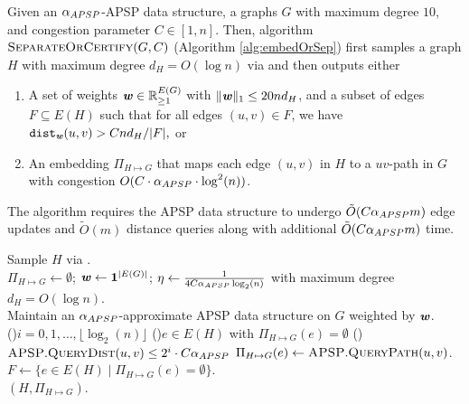 \begin{lemma}
\label{lemma:SeparateOrCertifyBalanced}
Given an $\alpha_{APSP}$-APSP data structure, a graphs $G$ with maximum degree $10$, and congestion parameter $C \in [1, n]$. Then,  algorithm $\textsc{SeparateOrCertify}(G, C)$ (Algorithm \ref{alg:embedOrSep}) first samples a graph $H$ with maximum degree $d_H = O(\log n)$ via  and then outputs either
\begin{enumerate}
    \item A set of weights $\boldsymbol{{\mathit{w}}} \in \mathbb{R}_{\geq 1}^{E(G)}$ with $\|\boldsymbol{{\mathit{w}}}\|_1 \leq 20n d_H$,  and a subset of edges $F \subseteq E(H)$ such that 
    for all edges $(u,v) \in F$, we have $\operatorname{\mathtt{dist}}_{\boldsymbol{{\mathit{w}}}}(u,v) > {C n d_H}/{|F|},$ or
    \item An embedding $\Pi_{H \mapsto G}$ that maps each edge $(u,v)$ in $H$ to a $uv$-path in $G$ with congestion $O(C \cdot \alpha_{APSP} \cdot \log^2(n))$.
\end{enumerate}
The algorithm requires the APSP data structure to undergo $\tilde{O}(C \alpha_{APSP} m)$ edge updates and $\tilde{O}(m)$ distance queries along with additional $\tilde{O}(C \alpha_{APSP} m)$ time.
\end{lemma}

\begin{algorithm}
\DontPrintSemicolon
Sample $H$ via .\\
$\Pi_{H \mapsto G} \gets \emptyset$; $\boldsymbol{\mathit{w}} \gets \mathbf{1}^{|E(G)|}$; $\eta \gets  \frac{1}{ 4 C \alpha_{APSP} \log_2(n)}$ with maximum degree $d_H = O(\log n)$.\label{lne:init}\\
Maintain an $\alpha_{APSP}$-approximate APSP data structure on $G$ weighted by $\boldsymbol{\mathit{w}}$.\\
\For(\label{lne:forLoop}){$i = 0, 1, \ldots, \lfloor \log_2(n) \rfloor$}{
    \ForEach(\label{lne:foreachUnrouted}){$e \in E(H)$ with $\Pi_{H \mapsto G}(e) = \emptyset$}{
        \If(\label{lne:ifReallyEmbed}){$\textsc{APSP}.\textsc{QueryDist}(u,v) \leq 2^{i} \cdot C \alpha_{APSP}$}{
            $\Pi_{H \mapsto G}(e) \gets \textsc{APSP}.\textsc{QueryPath}(u,v)$. \\
        }
    }
   $F \gets  \{ e \in  E(H) \;|\; \Pi_{H \mapsto G}(e) = \emptyset\}$.\\
}
\Return $(H, \Pi_{H \mapsto G})$. \label{lne:terminateEmbed}
\caption{$\textsc{SeparateOrCertify}(G, C)$}\label{alg:embedOrSep}
\end{algorithm}

